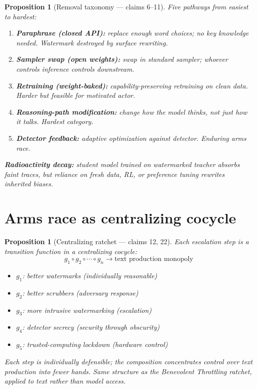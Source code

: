 \documentclass[11pt,a4paper]{article}
\newtheorem{proposition}[definition]{Proposition}
\begin{document}
\begin{proposition}[Removal taxonomy --- claims 6--11]
\label{prop:removal}
Five pathways from easiest to hardest:
\begin{enumerate}
  \item \textbf{Paraphrase (closed API):} replace enough word choices;
    no key knowledge needed. Watermark destroyed by surface rewriting.
  \item \textbf{Sampler swap (open weights):} swap in standard sampler;
    whoever controls inference controls downstream.
  \item \textbf{Retraining (weight-baked):} capability-preserving
    retraining on clean data. Harder but feasible for motivated actor.
  \item \textbf{Reasoning-path modification:} change how the model
    thinks, not just how it talks. Hardest category.
  \item \textbf{Detector feedback:} adaptive optimization against
    detector. Enduring arms race.
\end{enumerate}
\textbf{Radioactivity decay:} student model trained on watermarked
teacher absorbs faint traces, but reliance on fresh data, RL, or
preference tuning rewrites inherited biases.
\end{proposition}

\section{Arms race as centralizing cocycle}

\begin{proposition}[Centralizing ratchet --- claims 12, 22]
\label{prop:ratchet}
Each escalation step is a transition function in a centralizing cocycle:
\[
  g_1 \circ g_2 \circ \cdots \circ g_n \to \text{text production monopoly}
\]
\begin{itemize}
  \item $g_1$: better watermarks (individually reasonable)
  \item $g_2$: better scrubbers (adversary response)
  \item $g_3$: more intrusive watermarking (escalation)
  \item $g_4$: detector secrecy (security through obscurity)
  \item $g_5$: trusted-computing lockdown (hardware control)
\end{itemize}
Each step is individually defensible; the composition concentrates control
over text production into fewer hands. Same structure as the Benevolent
Throttling ratchet, applied to text rather than model access.
\end{proposition}
\end{document}
